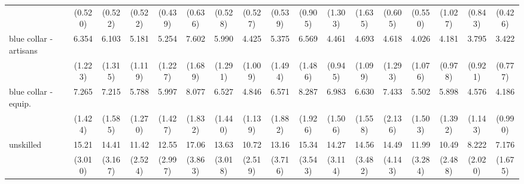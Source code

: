{\begin{tabular}{l*{16}{c}}
                    &     (0.520)         &     (0.522)         &     (0.522)         &     (0.439)         &     (0.636)         &     (0.528)         &     (0.527)         &     (0.539)         &     (0.905)         &     (1.303)         &     (1.635)         &     (0.605)         &     (0.550)         &     (1.027)         &     (0.843)         &     (0.426)         \\
[1em]
blue collar - artisans&       6.354\sym{***}&       6.103\sym{***}&       5.181\sym{***}&       5.254\sym{***}&       7.602\sym{***}&       5.990\sym{***}&       4.425\sym{***}&       5.375\sym{***}&       6.569\sym{***}&       4.461\sym{***}&       4.693\sym{***}&       4.618\sym{***}&       4.026\sym{***}&       4.181\sym{***}&       3.795\sym{***}&       3.422\sym{***}\\
                    &     (1.223)         &     (1.315)         &     (1.119)         &     (1.227)         &     (1.689)         &     (1.291)         &     (1.009)         &     (1.494)         &     (1.486)         &     (0.945)         &     (1.099)         &     (1.293)         &     (1.076)         &     (0.978)         &     (0.921)         &     (0.777)         \\
[1em]
blue collar - equip.&       7.265\sym{***}&       7.215\sym{***}&       5.788\sym{***}&       5.997\sym{***}&       8.077\sym{***}&       6.527\sym{***}&       4.846\sym{***}&       6.571\sym{***}&       8.287\sym{***}&       6.983\sym{***}&       6.630\sym{***}&       7.433\sym{***}&       5.502\sym{***}&       5.898\sym{***}&       4.576\sym{***}&       4.186\sym{***}\\
                    &     (1.424)         &     (1.585)         &     (1.270)         &     (1.427)         &     (1.832)         &     (1.440)         &     (1.139)         &     (1.882)         &     (1.926)         &     (1.506)         &     (1.558)         &     (2.136)         &     (1.503)         &     (1.392)         &     (1.143)         &     (0.990)         \\
[1em]
unskilled           &       15.21\sym{***}&       14.41\sym{***}&       11.42\sym{***}&       12.55\sym{***}&       17.06\sym{***}&       13.63\sym{***}&       10.72\sym{***}&       13.16\sym{***}&       15.34\sym{***}&       14.27\sym{***}&       14.56\sym{***}&       14.49\sym{***}&       11.99\sym{***}&       10.49\sym{***}&       8.222\sym{***}&       7.176\sym{***}\\
                    &     (3.010)         &     (3.167)         &     (2.524)         &     (2.997)         &     (3.863)         &     (3.018)         &     (2.519)         &     (3.716)         &     (3.543)         &     (3.114)         &     (3.482)         &     (4.143)         &     (3.284)         &     (2.488)         &     (2.020)         &     (1.675)         \\

\end{tabular}}
